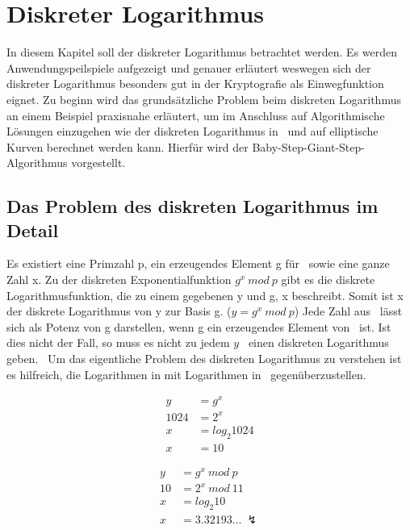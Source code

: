 \section{Diskreter Logarithmus}
	In diesem Kapitel soll der diskreter Logarithmus betrachtet werden. Es werden Anwendungspeilspiele aufgezeigt und genauer erläutert weswegen sich der diskreter Logarithmus besonders gut in der Kryptografie als Einwegfunktion eignet. Zu beginn wird das grundsätzliche Problem beim diskreten Logarithmus an einem Beispiel praxisnahe erläutert, um im Anschluss auf Algorithmische Lösungen einzugehen wie der diskreten Logarithmus in \myZPStern~und auf elliptische Kurven berechnet werden kann. Hierfür wird der Baby-Step-Giant-Step-Algorithmus vorgestellt.

	\subsection{Das Problem des diskreten Logarithmus im Detail}\label{Das Problem des diskreten Logarithmus im Detail}
		Es existiert eine Primzahl p, ein erzeugendes Element g für \myZPStern~sowie eine ganze Zahl x. Zu der diskreten Exponentialfunktion $g^x~mod~p$ gibt es die diskrete Logarithmusfunktion, die zu einem gegebenen y und g, x beschreibt. Somit ist x der diskrete Logarithmus von y zur Basis g. ($y = g^x~mod~p$) Jede Zahl aus \myZPStern~lässt sich als Potenz von g darstellen, wenn g ein erzeugendes Element von \myZPStern~ist. Ist dies nicht der Fall, so muss es nicht zu jedem $y$ \myin \myZPStern~einen diskreten Logarithmus geben.~\cite{Kryptografie:in:Theorie:und:Praxis} Um das eigentliche Problem des diskreten Logarithmus zu verstehen ist es hilfreich, die Logarithmen in  mit Logarithmen in \myZPStern~gegenüberzustellen.
		\begin{minipage}{0.24\textwidth}
			\begin{equation}
			\begin{aligned}
			y &= g^x\\
			1024 &= 2^x\\
			x &= log_2 1024\\
			x &= 10
			\end{aligned}
			\label{Gleichung Log in Z}
			\end{equation}
		\end{minipage}
		\begin{minipage}{0.24\textwidth}
			\begin{equation}
			\begin{aligned}
			y &= g^x~mod~p\\
			10 &= 2^x~mod~11\\
			x &= log_2 10\\
			x &= 3.32193...~\lightning
			\end{aligned}
			\label{Gleichung Log in ZP}
			\end{equation}
		\end{minipage}

